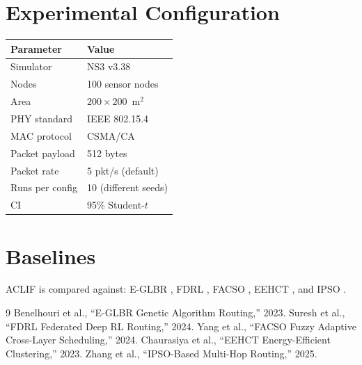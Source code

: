 \documentclass[a4paper,12pt]{article}
\begin{document}
\section{Experimental Configuration}
\begin{tabular}{ll}
\toprule
\textbf{Parameter} & \textbf{Value} \\
\midrule
Simulator      & NS3 v3.38 \\
Nodes          & 100 sensor nodes \\
Area           & $200 \times 200$~m$^2$ \\
PHY standard   & IEEE 802.15.4 \\
MAC protocol   & CSMA/CA \\
Packet payload & 512 bytes \\
Packet rate    & 5 pkt/s (default) \\
Runs per config & 10 (different seeds) \\
CI             & 95\% Student-$t$ \\
\bottomrule
\end{tabular}

\section{Baselines}
ACLIF is compared against: E-GLBR \cite{Benelhouri2023}, FDRL \cite{Suresh2024},
FACSO \cite{Yang2024204}, EEHCT \cite{Chaurasiya202325941}, and IPSO \cite{Zhang2025}.

\begin{thebibliography}{9}
 Benelhouri et al., ``E-GLBR Genetic Algorithm Routing,'' 2023.
 Suresh et al., ``FDRL Federated Deep RL Routing,'' 2024.
 Yang et al., ``FACSO Fuzzy Adaptive Cross-Layer Scheduling,'' 2024.
 Chaurasiya et al., ``EEHCT Energy-Efficient Clustering,'' 2023.
 Zhang et al., ``IPSO-Based Multi-Hop Routing,'' 2025.
\end{thebibliography}
\end{document}
